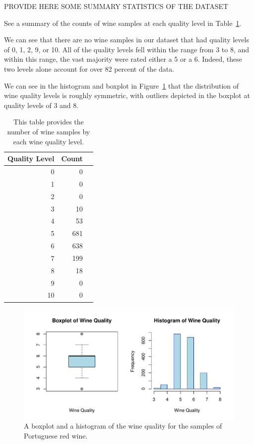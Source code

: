 \documentclass[12pt]{article}
\begin{document}
PROVIDE HERE SOME SUMMARY STATISTICS OF THE DATASET

See a summary of the counts of wine samples at each quality level in 
Table~\ref{tab:qual}.

We can see that there are no wine samples in our dataset that had quality 
levels of 0, 1, 2, 9, or 10.  All of the quality levels fell within the 
range from 3 to 8, and within this range, the vast majority were rated 
either a 5 or a 6.  Indeed, these two levels alone account for over 82 
percent of the data.  

We can see in the histogram and boxplot in Figure~\ref{fig:wine} that 
the distribution of wine quality levels is roughly symmetric, with 
outliers depicted in the boxplot at quality levels of 3 and 8.  

\begin{table}[tbp]
 \caption{This table provides the number of wine samples by each wine quality level.}
\label{tab:qual}
\centering
\begin{tabular}{rrr}
 \toprule
 Quality Level & Count \\ 
 \midrule
0 & 0 \\ 
1 & 0 \\ 
2 & 0 \\ 
3 & 10 \\ 
4 & 53 \\ 
5 & 681 \\ 
6 & 638 \\ 
7 & 199 \\ 
8 & 18 \\ 
9 & 0 \\ 
10 & 0 \\
\bottomrule
\end{tabular}
\end{table}

\begin{figure}[tbp]
 \centering
 \includegraphics[width=\textwidth]{manuscriptfigure.pdf}
 \caption{A boxplot and a histogram of the wine quality for the samples of Portuguese red wine.}
 \label{fig:wine}
\end{figure}
\end{document}
